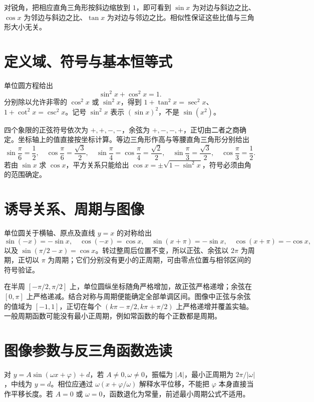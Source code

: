 \documentclass[UTF8]{ctexbook}
\begin{document}
对锐角，把相应直角三角形按斜边缩放到 $1$，即可看到 $\sin x$ 为对边与斜边之比、$\cos x$ 为邻边与斜边之比、$\tan x$ 为对边与邻边之比。相似性保证这些比值与三角形大小无关。

\section{定义域、符号与基本恒等式}
单位圆方程给出
\begin{equation}\label{eq:em-trig-pythagorean}
 \sin^2x+\cos^2x=1.
\end{equation}
分别除以允许非零的 $\cos^2x$ 或 $\sin^2x$，得到 $1+\tan^2x=\sec^2x$、$1+\cot^2x=\csc^2x$。记号 $\sin^2x$ 表示 $(\sin x)^2$，不是 $\sin(x^2)$。

四个象限的正弦符号依次为 $+,+,-,-$，余弦为 $+,-,-,+$，正切由二者之商确定。坐标轴上的值直接按坐标计算。等边三角形作高与等腰直角三角形分别给出
\[
 \sin\frac\pi6=\frac12,\quad\cos\frac\pi6=\frac{\sqrt3}2,\quad
 \sin\frac\pi4=\cos\frac\pi4=\frac{\sqrt2}2,\quad
 \sin\frac\pi3=\frac{\sqrt3}2,\quad\cos\frac\pi3=\frac12.
\]
若由 $\sin x$ 求 $\cos x$，平方关系只能给出 $\cos x=\pm\sqrt{1-\sin^2x}$，符号必须由角的范围确定。

\section{诱导关系、周期与图像}
单位圆关于横轴、原点及直线 $y=x$ 的对称给出
\[
 \sin(-x)=-\sin x,\quad \cos(-x)=\cos x,\quad
 \sin(x+\pi)=-\sin x,\quad\cos(x+\pi)=-\cos x,
\]
以及 $\sin(\pi/2-x)=\cos x$。转过整周后位置不变，所以正弦、余弦以 $2\pi$ 为周期，正切以 $\pi$ 为周期；它们分别没有更小的正周期，可由零点位置与相邻区间的符号验证。

在半周 $[-\pi/2,\pi/2]$ 上，单位圆纵坐标随角严格增加，故正弦严格递增；余弦在 $[0,\pi]$ 上严格递减。结合对称与周期便能确定全部单调区间。图像中正弦与余弦的值域为 $[-1,1]$，正切在每个 $(k\pi-\pi/2,k\pi+\pi/2)$ 上严格递增并覆盖实轴。一般周期函数可能没有最小正周期，例如常函数的每个正数都是周期。

\section{图像参数与反三角函数选读}
对 $y=A\sin(\omega x+\varphi)+d$，若 $A\ne0,\omega\ne0$，振幅为 $|A|$，最小正周期为 $2\pi/|\omega|$，中线为 $y=d$。相位应通过 $\omega(x+\varphi/\omega)$ 解释水平位移，不能把 $\varphi$ 本身直接当作平移长度。若 $A=0$ 或 $\omega=0$，函数退化为常量，前述最小周期公式不适用。
\end{document}
